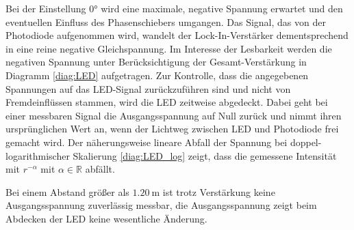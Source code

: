Bei der Einstellung 0° wird eine maximale, negative Spannung erwartet und den eventuellen Einfluss des Phasenschiebers umgangen.
Das Signal, das von der Photodiode aufgenommen wird, wandelt der Lock-In-Verstärker dementsprechend in eine reine negative Gleichspannung.
Im Interesse der Lesbarkeit werden die negativen Spannung unter Berücksichtigung der Gesamt-Verstärkung in Diagramm \ref{diag:LED} aufgetragen.
Zur Kontrolle, dass die angegebenen Spannungen auf das LED-Signal zurückzuführen sind und nicht von Fremdeinflüssen stammen, wird die LED zeitweise abgedeckt.
Dabei geht bei einer messbaren Signal die Ausgangsspannung auf Null zurück und nimmt ihren ursprünglichen Wert an, wenn der Lichtweg zwischen LED und Photodiode frei gemacht wird.
Der näherungsweise lineare Abfall der Spannung bei doppel-logarithmischer Skalierung \eqref{diag:LED_log} zeigt, dass die gemessene Intensität mit $r^{-\alpha}$ mit $\alpha \in \mathbb{R}$ abfällt.

Bei einem Abstand größer als $\SI{1.20}{\meter}$ ist trotz Verstärkung keine Ausgangsspannung zuverlässig messbar, 
die Ausgangsspannung zeigt beim Abdecken der LED keine wesentliche Änderung.

